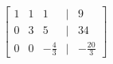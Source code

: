 \documentclass[preview]{standalone}
\begin{document}
\begin{align*}
\begin{bmatrix} 1 & 1 & 1 & | & 9 \\ 0 & 3 & 5 & | & 34 \\ 0 & 0 & -\frac{4}{3} & | & -\frac{20}{3} \end{bmatrix}
\end{align*}
\end{document}
